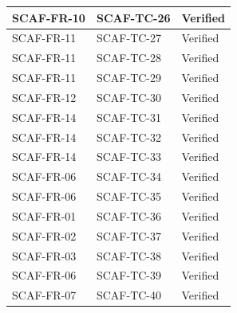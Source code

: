 \documentclass{report}
\begin{document}
\begin{tabularx}{\textwidth}{ 
  |p{}%
  |p{}%
  |p{}|%
}
  SCAF-FR-10 & SCAF-TC-26 & Verified \\
  \hline
  SCAF-FR-11 & SCAF-TC-27 & Verified \\
  \hline
  SCAF-FR-11 & SCAF-TC-28 & Verified \\
  \hline
  SCAF-FR-11 & SCAF-TC-29 & Verified \\
  \hline
  SCAF-FR-12 & SCAF-TC-30 & Verified \\
  \hline
  SCAF-FR-14 & SCAF-TC-31 & Verified \\
  \hline
  SCAF-FR-14 & SCAF-TC-32 & Verified \\
  \hline
  SCAF-FR-14 & SCAF-TC-33 & Verified \\
  \hline
  SCAF-FR-06 & SCAF-TC-34 & Verified \\
  \hline
  SCAF-FR-06 & SCAF-TC-35 & Verified \\
  \hline
  SCAF-FR-01 & SCAF-TC-36 & Verified \\
  \hline
  SCAF-FR-02 & SCAF-TC-37 & Verified \\
  \hline
  SCAF-FR-03 & SCAF-TC-38 & Verified \\
  \hline
  SCAF-FR-06 & SCAF-TC-39 & Verified \\
  \hline
  SCAF-FR-07 & SCAF-TC-40 & Verified \\
  \hline
\end{tabularx}
\end{document}
